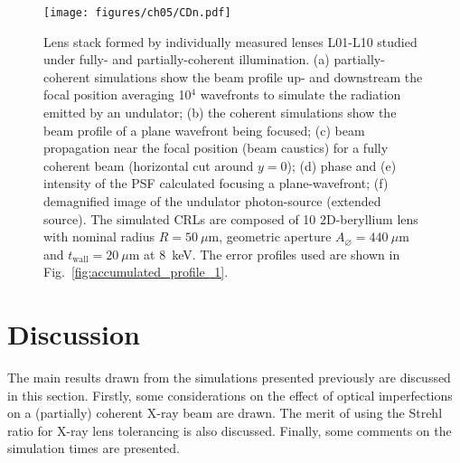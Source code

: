 \begin{refsection}
\begin{figure}[ht]
        \centering
        {\texttt{[image: figures/ch05/CDn.pdf]}}
        \caption[L01-L10 studied under fully- and partially-coherent illuminations]{Lens stack formed by individually measured lenses L01-L10 studied under fully- and partially-coherent illumination. (a) partially-coherent simulations show the beam profile up- and downstream the focal position averaging 10$^{4}$ wavefronts to simulate the radiation emitted by an undulator; (b) the coherent simulations show the beam profile of a plane wavefront being focused; (c) beam propagation near the focal position (beam caustics) for a fully coherent beam (horizontal cut around $y=0$); (d) phase and (e) intensity of the PSF calculated focusing a plane-wavefront; (f) demagnified image of the undulator photon-source (extended source). The simulated CRLs are composed of 10 2D-beryllium lens with nominal radius $R=50~\mu\text{m}$, geometric aperture $A_{\diameter}=440~\mu\text{m}$ and $t_\text{wall}=20~\mu$m at 8~keV. The error profiles used are shown in Fig.~\ref{fig:accumulated_profile_1}.}\label{fig:CDnS}
\end{figure}

\clearpage


\section{Discussion}\label{sec:discussion}

The main results drawn from the simulations presented previously are discussed in this section. Firstly, some considerations on the effect of optical imperfections on a (partially) coherent X-ray beam are drawn. The merit of using the Strehl ratio for X-ray lens tolerancing is also discussed. Finally, some comments on the simulation times are presented.


\end{refsection}
